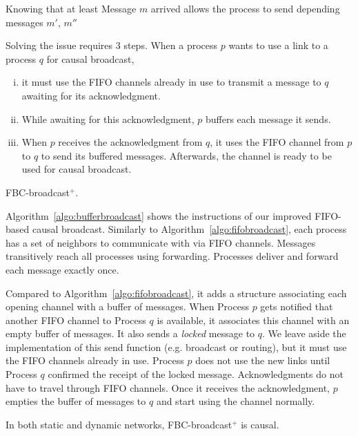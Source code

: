 Knowing that at least Message $m$ arrived allows the process to send
depending messages $m'$, $m''$ 


Solving the issue requires 3 steps. When a process $p$ wants to use a link to a
process $q$ for causal broadcast,
\begin{enumerate}[(i)]
\item it must use the FIFO channels already in use to transmit a message to $q$
  awaiting for its acknowledgment.
\item While awaiting for this acknowledgment, $p$ buffers each message it
  sends.
\item When $p$ receives the acknowledgment from $q$, it uses the FIFO channel
  from $p$ to $q$ to send its buffered messages. Afterwards, the channel is
  ready to be used for causal broadcast.
\end{enumerate}

\begin{algorithm}[h]
  
  \caption{\label{algo:bufferbroadcast}FBC-broadcast$^+$.}
\end{algorithm}


Algorithm~\ref{algo:bufferbroadcast} shows the instructions of our improved
FIFO-based causal broadcast. Similarly to Algorithm~\ref{algo:fifobroadcast},
each process has a set of neighbors to communicate with via FIFO
channels. Messages transitively reach all processes using forwarding. Processes
deliver and forward each message exactly once.  

Compared to Algorithm~\ref{algo:fifobroadcast}, it adds a structure associating
each opening channel with a buffer of messages. When Process $p$ gets notified
that another FIFO channel to Process $q$ is available, it associates this
channel with an empty buffer of messages. It also sends a \emph{locked} message
to $q$. We leave aside the implementation of this send function (e.g. broadcast
or routing), but it must use the FIFO channels already in use.  Process $p$ does
not use the new links until Process $q$ confirmed the receipt of the locked
message. Acknowledgments do not have to travel through FIFO channels.  Once it
receives the acknowledgment, $p$ empties the buffer of messages to $q$ and start
using the channel normally.

\begin{theorem}
  In both static and dynamic networks, FBC-broadcast$^+$ is causal.
\end{theorem}

